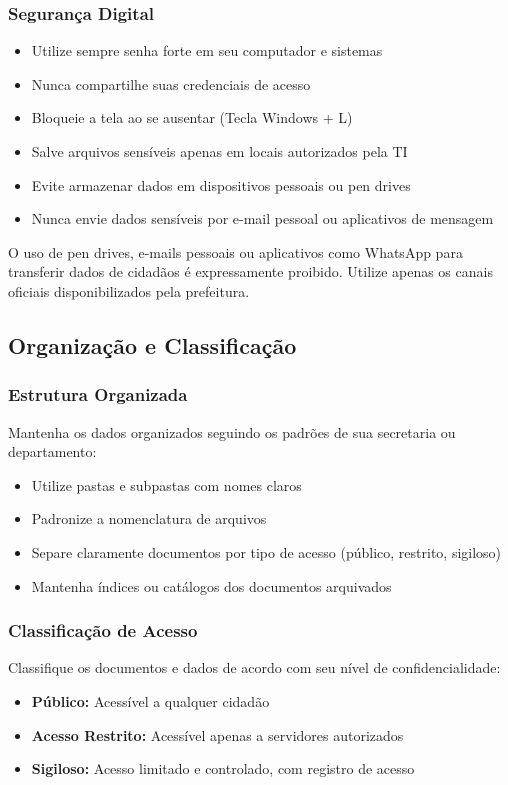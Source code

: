 \documentclass[12pt,a4paper]{article}
\begin{document}
\subsubsection{Segurança Digital}
\begin{itemize}
    \item Utilize sempre senha forte em seu computador e sistemas
    \item Nunca compartilhe suas credenciais de acesso
    \item Bloqueie a tela ao se ausentar (Tecla Windows + L)
    \item Salve arquivos sensíveis apenas em locais autorizados pela TI
    \item Evite armazenar dados em dispositivos pessoais ou pen drives
    \item Nunca envie dados sensíveis por e-mail pessoal ou aplicativos de mensagem
\end{itemize}

\begin{tcolorbox}[colback=vermelhoclaro, colframe=red!75!black, title=Atenção!]
O uso de pen drives, e-mails pessoais ou aplicativos como WhatsApp para transferir dados de cidadãos é expressamente proibido. Utilize apenas os canais oficiais disponibilizados pela prefeitura.
\end{tcolorbox}

\subsection{Organização e Classificação}

\subsubsection{Estrutura Organizada}
Mantenha os dados organizados seguindo os padrões de sua secretaria ou departamento:
\begin{itemize}
    \item Utilize pastas e subpastas com nomes claros
    \item Padronize a nomenclatura de arquivos
    \item Separe claramente documentos por tipo de acesso (público, restrito, sigiloso)
    \item Mantenha índices ou catálogos dos documentos arquivados
\end{itemize}

\subsubsection{Classificação de Acesso}
Classifique os documentos e dados de acordo com seu nível de confidencialidade:
\begin{itemize}
    \item \textbf{Público:} Acessível a qualquer cidadão
    \item \textbf{Acesso Restrito:} Acessível apenas a servidores autorizados
    \item \textbf{Sigiloso:} Acesso limitado e controlado, com registro de acesso
\end{itemize}
\end{document}
